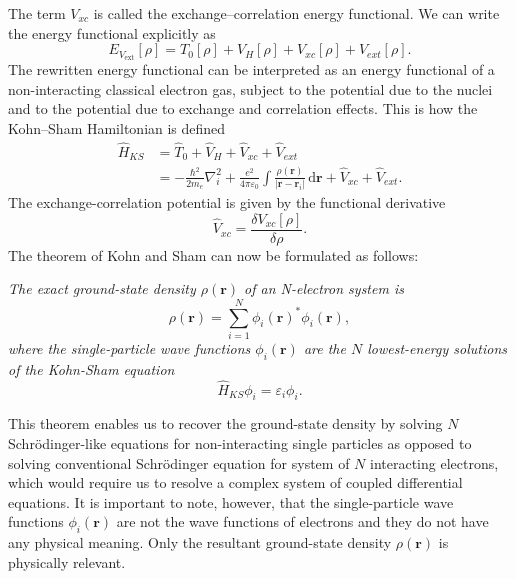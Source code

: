 The term $V_{xc}$ is called the exchange--correlation energy functional. We
can write the energy functional explicitly as
\begin{equation}
  E_{V_\mathrm{ext}}[\rho] = T_0[\rho] + V_H[\rho] + V_{xc}[\rho]
  + V_{ext}[\rho].
\end{equation}
The rewritten energy functional can be interpreted as an energy functional of
a non-interacting classical electron gas, subject to the potential due to the
nuclei and to the potential due to exchange and correlation effects. This is
how the Kohn--Sham Hamiltonian is defined
\begin{equation}
\begin{alignedat}{2}
  \hat H_{KS} &= \hat T_0 + \hat V_H + \hat V_{xc} + \hat V_{ext} \\
  &= -\frac{\hbar^2}{2 m_e} \nabla_i^2
  + \frac{e^2}{4 \pi \varepsilon_0} \int
  \frac{\rho(\mathbf{r})}{|\mathbf{r} - \mathbf{r}_i|} \, \mathrm{d}\mathbf{r}
  + \hat V_{xc} + \hat V_{ext}.
\end{alignedat}
\end{equation}
The exchange-correlation potential is given by the functional derivative
\begin{equation}
  \hat V_{xc} = \frac{\delta V_{xc}[\rho]}{\delta \rho}.
\end{equation}
The theorem of Kohn and Sham can now be formulated as follows:
\begin{displayquote}
  \textit{
    The exact ground-state density $\rho(\mathbf{r})$ of an N-electron system
    is
  }
  \begin{equation}
    \rho(\mathbf{r}) = \sum_{i=1}^N \phi_i(\mathbf{r})^* \phi_i(\mathbf{r}),
  \end{equation}
  \textit{
    where the single-particle wave functions $\phi_i(\mathbf{r})$ are the $N$
    lowest-energy solutions of the Kohn-Sham equation
  }
  \begin{equation}
    \hat H_{KS} \phi_i = \varepsilon_i \phi_i.
  \end{equation}
\end{displayquote}
This theorem enables us to recover the ground-state density by solving $N$
Schrödinger-like equations for non-interacting single particles as opposed to
solving conventional Schrödinger equation for system of $N$ interacting
electrons, which would require us to resolve a complex system of coupled
differential equations. It is important to note, however, that the
single-particle wave functions $\phi_i(\mathbf{r})$ are not the wave functions
of electrons and they do not have any physical meaning. Only the resultant
ground-state density $\rho(\mathbf{r})$ is physically relevant.

